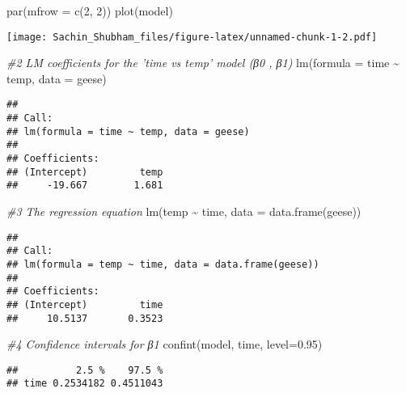 \documentclass[
]{article}
\newenvironment{Shaded}{\begin{snugshade}}{\end{snugshade}}
\newcommand{\AttributeTok}[1]{\textcolor[rgb]{0.77,0.63,0.00}{#1}}
\newcommand{\CommentTok}[1]{\textcolor[rgb]{0.56,0.35,0.01}{\textit{#1}}}
\newcommand{\DecValTok}[1]{\textcolor[rgb]{0.00,0.00,0.81}{#1}}
\newcommand{\FloatTok}[1]{\textcolor[rgb]{0.00,0.00,0.81}{#1}}
\newcommand{\FunctionTok}[1]{\textcolor[rgb]{0.00,0.00,0.00}{#1}}
\newcommand{\NormalTok}[1]{#1}
\newcommand{\SpecialCharTok}[1]{\textcolor[rgb]{0.00,0.00,0.00}{#1}}
\newcommand{\StringTok}[1]{\textcolor[rgb]{0.31,0.60,0.02}{#1}}
\begin{document}
\begin{Shaded}
\begin{Highlighting}[]
\FunctionTok{par}\NormalTok{(}\AttributeTok{mfrow =} \FunctionTok{c}\NormalTok{(}\DecValTok{2}\NormalTok{, }\DecValTok{2}\NormalTok{))}
\FunctionTok{plot}\NormalTok{(model)}
\end{Highlighting}
\end{Shaded}

\texttt{[image: Sachin\_Shubham\_files/figure-latex/unnamed-chunk-1-2.pdf]}

\begin{Shaded}
\begin{Highlighting}[]
\CommentTok{\#2  LM coefficients for the ’time vs temp’ model (β0 , β1)}
\FunctionTok{lm}\NormalTok{(}\AttributeTok{formula =}\NormalTok{ time }\SpecialCharTok{\textasciitilde{}}\NormalTok{ temp, }\AttributeTok{data =}\NormalTok{ geese)}
\end{Highlighting}
\end{Shaded}

\begin{verbatim}
## 
## Call:
## lm(formula = time ~ temp, data = geese)
## 
## Coefficients:
## (Intercept)         temp  
##     -19.667        1.681
\end{verbatim}

\begin{Shaded}
\begin{Highlighting}[]
\CommentTok{\#3 The regression equation}
\FunctionTok{lm}\NormalTok{(temp }\SpecialCharTok{\textasciitilde{}}\NormalTok{ time, }\AttributeTok{data =} \FunctionTok{data.frame}\NormalTok{(geese))}
\end{Highlighting}
\end{Shaded}

\begin{verbatim}
## 
## Call:
## lm(formula = temp ~ time, data = data.frame(geese))
## 
## Coefficients:
## (Intercept)         time  
##     10.5137       0.3523
\end{verbatim}

\begin{Shaded}
\begin{Highlighting}[]
\CommentTok{\#4 Confidence intervals for β1}
\FunctionTok{confint}\NormalTok{(model, }\StringTok{\textquotesingle{}time\textquotesingle{}}\NormalTok{, }\AttributeTok{level=}\FloatTok{0.95}\NormalTok{)}
\end{Highlighting}
\end{Shaded}

\begin{verbatim}
##          2.5 %    97.5 %
## time 0.2534182 0.4511043
\end{verbatim}
\end{document}
